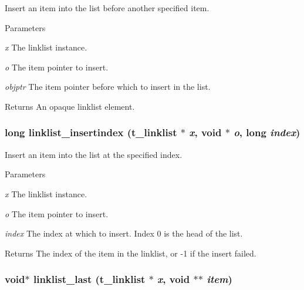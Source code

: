 Insert an item into the list before another specified item. 
\begin{DoxyParams}{Parameters}
\item[{\em x}]The linklist instance. \item[{\em o}]The item pointer to insert. \item[{\em objptr}]The item pointer before which to insert in the list.\end{DoxyParams}
\begin{DoxyReturn}{Returns}
An opaque linklist element. 
\end{DoxyReturn}
\hypertarget{group__linklist_gac652f2501c274abd1d8fe53626153bde}{
\subsubsection[{linklist\_\-insertindex}]{\setlength{\rightskip}{0pt plus 5cm}long linklist\_\-insertindex ({\bf t\_\-linklist} $\ast$ {\em x}, \/  void $\ast$ {\em o}, \/  long {\em index})}}
\label{group__linklist_gac652f2501c274abd1d8fe53626153bde}


Insert an item into the list at the specified index. 
\begin{DoxyParams}{Parameters}
\item[{\em x}]The linklist instance. \item[{\em o}]The item pointer to insert. \item[{\em index}]The index at which to insert. Index 0 is the head of the list. \end{DoxyParams}
\begin{DoxyReturn}{Returns}
The index of the item in the linklist, or -\/1 if the insert failed. 
\end{DoxyReturn}
\hypertarget{group__linklist_gad45ad220a822b64458152e60f504e846}{
\subsubsection[{linklist\_\-last}]{\setlength{\rightskip}{0pt plus 5cm}void$\ast$ linklist\_\-last ({\bf t\_\-linklist} $\ast$ {\em x}, \/  void $\ast$$\ast$ {\em item})}}
\label{group__linklist_gad45ad220a822b64458152e60f504e846}



